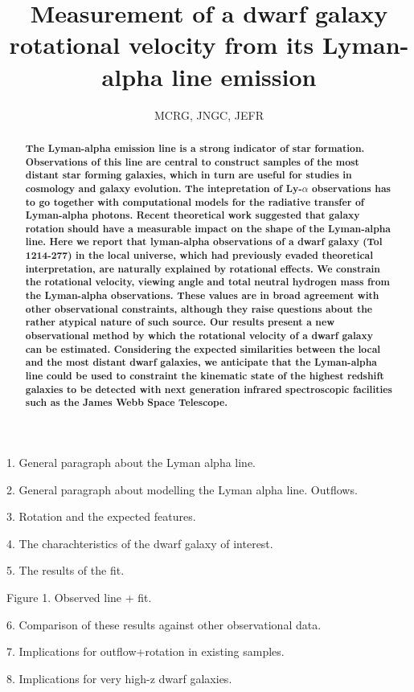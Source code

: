 \documentclass{article}
\title{Measurement of a dwarf galaxy rotational velocity from its Lyman-alpha
  line emission}
\author{MCRG, JNGC, JEFR}
\begin{document}
\maketitle
\begin{abstract}
{\bf The Lyman-alpha emission line is a strong indicator of star formation.
Observations of this line are central to construct samples of the most
distant star forming galaxies, which in turn are useful for studies in
cosmology and galaxy evolution.  
The intepretation of Ly-$\alpha$ observations has to go together with
computational models for the radiative transfer of Lyman-alpha photons.
Recent theoretical work suggested that galaxy rotation should have a
measurable impact on the shape of the Lyman-alpha line. 
Here we report that lyman-alpha observations of a dwarf galaxy (Tol
1214-277) in the local universe, which had previously evaded theoretical 
interpretation, are naturally explained by rotational effects.
We constrain the rotational velocity, viewing angle and total
neutral hydrogen mass from the Lyman-alpha observations.
These values are in broad agreement with other observational
constraints, although  they raise questions about the rather atypical nature
of such source.
Our results present a new observational method by which the rotational
velocity of a dwarf galaxy can be estimated. 
Considering the expected similarities between the local and the most
distant dwarf galaxies, we anticipate that the Lyman-alpha line could be
used to constraint the kinematic state of the highest redshift
galaxies to be detected with next generation infrared spectroscopic
facilities such as the James Webb Space Telescope.}

\end{abstract}

1. General paragraph about the Lyman alpha line.

2. General paragraph about modelling the Lyman alpha
line. Outflows.

3. Rotation and the expected features.

4. The charachteristics of the dwarf galaxy of interest.

5. The results of the fit. 

Figure 1. Observed line + fit. 

6. Comparison of these results against other observational data.

7. Implications for outflow+rotation in existing samples.

8. Implications for very high-z dwarf galaxies. 
\end{document}
